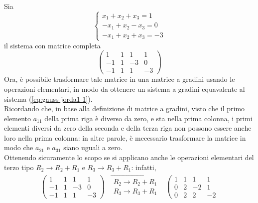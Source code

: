 \begin{es}
  \label{es:gauss-jorda1}
  Sia
  \begin{equation}
    \label{eq:gauss-jorda1-1}
    \begin{cases}
      x_1+x_2+x_3=1\\
      -x_1+x_2-x_3=0\\
      -x_1+x_2+x_3=-3
    \end{cases}
  \end{equation}
  il sistema con matrice completa
  \begin{equation}
    \label{eq:gauss-jorda1-2}
    \left(
      \begin{array}{ccc|c}
        1 & 1 & 1 & 1\\
        -1 & 1 & -3 & 0\\
        -1 & 1 & 1 & -3
      \end{array}\right)
  \end{equation}
  Ora, è possibile trasformare tale matrice in una matrice a gradini
  usando le operazioni elementari, in modo da ottenere un sistema a
  gradini equavalente al sistema (\ref{eq:gauss-jorda1-1}).\\ Ricordando
  che, in base alla definizione di matrice a gradini, visto che il primo
  elemento $a_{11}$ della prima riga è diverso da zero, e sta nella prima
  colonna, i primi elementi diversi da zero della seconda e della terza
  riga non possono essere anche loro nella prima colonna: in altre parole,
  è mecessario trasformare la matrice in modo che $a_{21}$ e $a_{31}$
  siano uguali a zero.\\
  Ottenendo sicuramente lo scopo se si applicano anche le operazioni
  elementari del terzo tipo $R_2\to R_2+R_1$ e $R_3\to R_3+R_1$: infatti,
  \begin{eqnarray*}
    \left(
      \begin{array}{ccc|c}
        1 & 1 & 1 & 1\\
        -1 & 1 & -3 & 0\\
        -1 & 1 & 1 & -3
      \end{array}\right)& \overrightarrow{
        \begin{matrix}
          R_2\to R_2+R_1\\
          R_3\to R_3+R_1
        \end{matrix}
      }& \left(
        \begin{array}{ccc|c}
          1 & 1 & 1 & 1\\
          0 & 2 & -2 & 1\\
          0 & 2 & 2 & -2

\end{array}
\end{eqnarray*}
\end{es}
